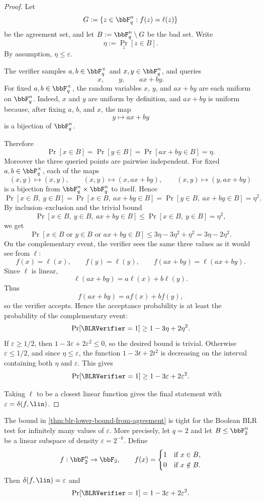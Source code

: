 \begin{proof}
Let
\[
    G:=\{z\in\bbF_q^n : f(z)=\ell(z)\}
\]
be the agreement set, and let $B:=\bbF_q^n\setminus G$ be the bad set. Write
\[
    \eta:=\Pr_z[z\in B].
\]
By assumption, $\eta\le\varepsilon$.

The verifier samples $a,b\in\bbF_q^\times$ and $x,y\in\bbF_q^n$, and queries
\[
    x,\qquad y,\qquad ax+by.
\]
For fixed $a,b\in\bbF_q^\times$, the random variables $x$, $y$, and $ax+by$ are each
uniform on $\bbF_q^n$. Indeed, $x$ and $y$ are uniform by definition, and $ax+by$ is
uniform because, after fixing $a$, $b$, and $x$, the map
\[
    y\mapsto ax+by
\]
is a bijection of $\bbF_q^n$.

Therefore
\[
    \Pr[x\in B]=\Pr[y\in B]=\Pr[ax+by\in B]=\eta.
\]
Moreover the three queried points are pairwise independent. For fixed
$a,b\in\bbF_q^\times$, each of the maps
\[
    (x,y)\mapsto (x,y),\qquad
    (x,y)\mapsto (x,ax+by),\qquad
    (x,y)\mapsto (y,ax+by)
\]
is a bijection from $\bbF_q^n\times\bbF_q^n$ to itself. Hence
\[
    \Pr[x\in B,\ y\in B]
    =
    \Pr[x\in B,\ ax+by\in B]
    =
    \Pr[y\in B,\ ax+by\in B]
    =
    \eta^2.
\]
By inclusion--exclusion and the trivial bound
\[
    \Pr[x\in B,\ y\in B,\ ax+by\in B]\le \Pr[x\in B,\ y\in B]=\eta^2,
\]
we get
\[
    \Pr[x\in B\text{ or }y\in B\text{ or }ax+by\in B]
    \le
    3\eta-3\eta^2+\eta^2
    =
    3\eta-2\eta^2.
\]
On the complementary event, the verifier sees the same three values as it would see from
$\ell$:
\[
    f(x)=\ell(x),\qquad
    f(y)=\ell(y),\qquad
    f(ax+by)=\ell(ax+by).
\]
Since $\ell$ is linear,
\[
    \ell(ax+by)=a\ell(x)+b\ell(y).
\]
Thus
\[
    f(ax+by)=a f(x)+b f(y),
\]
so the verifier accepts. Hence the acceptance probability is at least the probability of
the complementary event:
\[
    \Pr[\BLRVerifier=1]\ge 1-3\eta+2\eta^2.
\]
If $\varepsilon\ge 1/2$, then $1-3\varepsilon+2\varepsilon^2\le 0$, so the desired bound is
trivial. Otherwise $\varepsilon\le 1/2$, and since $\eta\le\varepsilon$, the function
$1-3t+2t^2$ is decreasing on the interval containing both $\eta$ and $\varepsilon$. This gives
\[
    \Pr[\BLRVerifier=1]\ge 1-3\varepsilon+2\varepsilon^2.
\]

Taking $\ell$ to be a closest linear function gives the final statement with
$\varepsilon=\delta(f,\lin)$.
\end{proof}

\begin{theorem}
\label{thm:boolean-blr-lower-bound-tight-subspace}
The bound in \cref{thm:blr-lower-bound-from-agreement} is tight for the Boolean BLR test
for infinitely many values of $\varepsilon$. More precisely, let $q=2$ and let
$B\le \bbF_2^n$ be a linear subspace of density $\varepsilon=2^{-k}$. Define
\[
    f:\bbF_2^n\to\bbF_2,
    \qquad
    f(x)=
    \begin{cases}
        1 & \text{if } x\in B,\\
        0 & \text{if } x\notin B.
    \end{cases}
\]
Then $\delta(f,\lin)=\varepsilon$ and
\[
    \Pr[\BLRVerifier=1]=1-3\varepsilon+2\varepsilon^2.
\]
\end{theorem}

